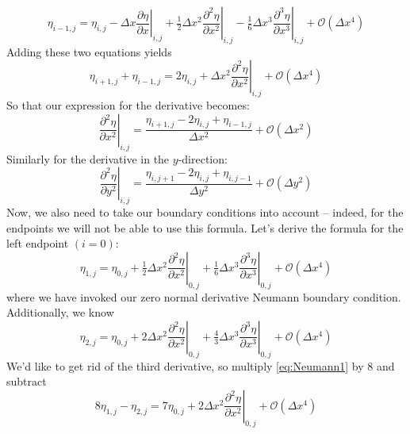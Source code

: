 \documentclass[reqno]{article}
\begin{document}
	\begin{equation}
		\eta_{i - 1, j} = \eta_{i, j} - \Delta x \left. \frac{\partial \eta}{\partial x}\right|_{i, j} + \tfrac12 \Delta x^2 \left. \frac{\partial^2 \eta}{\partial x^2} \right|_{i, j} - \tfrac16 \Delta x^3 \left.\frac{\partial^3 \eta}{\partial x^3}\right|_{i, j} + \mathcal{O}\left( \Delta x^4 \right)
	\end{equation}
	Adding these two equations yields
	\begin{equation}
		\eta_{i + 1, j} + \eta_{i - 1, j} = 2\eta_{i, j} + \Delta x^2 \left.\frac{\partial^2\eta}{\partial x^2}\right|_{i, j} + \mathcal{O}\left( \Delta x^4 \right) 
	\end{equation}
	So that our expression for the derivative becomes:
	\begin{equation}
		\left.\frac{\partial^2 \eta}{\partial x^2}\right|_{i, j} = \frac{\eta_{i + 1, j} - 2\eta_{i, j} + \eta_{i - 1, j}}{\Delta x^2} + \mathcal{O} \left(\Delta x^2\right)
	\end{equation}
	Similarly for the derivative in the $y$-direction:
	\begin{equation}
		\left.\frac{\partial^2 \eta}{\partial y^2}\right|_{i, j} = \frac{\eta_{i, j + 1} - 2\eta_{i, j} + \eta_{i , j - 1}}{\Delta y^2} + \mathcal{O} \left(\Delta y^2\right)
	\end{equation}
	Now, we also need to take our boundary conditions into account -- indeed, for the endpoints we will not be able to use this formula. Let's derive the formula for the left endpoint $(i = 0)$:
	\begin{equation} \label{eq:Neumann1}
		\eta_{1, j} = \eta_{0, j} + \tfrac12 \Delta x^2 \left. \frac{\partial^2 \eta}{\partial x^2} \right|_{0, j} + \tfrac16 \Delta x^3 \left.\frac{\partial^3 \eta}{\partial x^3}\right|_{0, j} + \mathcal{O}\left( \Delta x^4 \right)
	\end{equation}
	where we have invoked our zero normal derivative Neumann boundary condition. Additionally, we know
	\begin{equation}
		\eta_{2, j} = \eta_{0, j} + 2 \Delta x^2 \left. \frac{\partial^2 \eta}{\partial x^2} \right|_{0, j} + \tfrac43 \Delta x^3 \left.\frac{\partial^3 \eta}{\partial x^3}\right|_{0, j} + \mathcal{O}\left( \Delta x^4 \right)
	\end{equation}
	We'd like to get rid of the third derivative, so multiply \eqref{eq:Neumann1} by 8 and subtract
	\begin{equation}
		8\eta_{1, j} - \eta_{2, j} = 7\eta_{0, j} + 2\Delta x^2 \left.\frac{\partial^2 \eta}{\partial x^2} \right|_{0, j} + \mathcal{O} \left( \Delta x^4 \right) 
	\end{equation}
\end{document}
